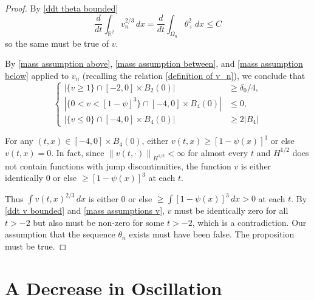 \documentclass[11pt]{amsart}
\theoremstyle{remark}
\theoremstyle{definition}
\newcommand{\R}{\mathbb{R}}
\newcommand{\norm}[1]{\left\lVert#1\right\rVert}
\newcommand{\abs}[1]{\left\lvert #1 \right\rvert}
\newcommand{\ddt}{\frac{d}{dt}}
\begin{document}
\begin{proof}
By \eqref{ddt theta bounded}
\begin{equation} \label{ddt v bounded} \ddt \int_{\R^2} v_n^{2/3} \,dx = \ddt \int_{\Omega_n} \theta_+^2 \,dx \leq C \end{equation}
so the same must be true of $v$.

By \eqref{mass assumption above}, \eqref{mass assumption between}, and \eqref{mass assumption below} applied to $v_n$ (recalling the relation \eqref{definition of v_n}), we conclude that
\begin{equation} \label{mass assumptions v} \begin{cases} 
\abs{\{v \geq 1\} \cap [-2,0]\times B_2(0)} &\geq \delta_0/4, \\
\abs{\{0 < v < [1-\psi]^3\} \cap [-4,0]\times B_4(0)} &\leq 0, \\
\abs{\{v \leq 0\} \cap [-4,0]\times B_4(0)} &\geq 2|B_4|
\end{cases} \end{equation}


For any $(t,x) \in [-4,0]\times B_4(0)$, either $v(t,x) \geq [1 - \psi(x)]^3$ or else $v(t,x) = 0$.  In fact, since $\norm{v(t,\cdot)}_{H^{1/2}} < \infty$ for almost every $t$ and $H^{1/2}$ does not contain functions with jump discontinuities, the function $v$ is either identically 0 or else $\geq [1-\psi(x)]^3$ at each $t$.  

Thus $\int v(t,x)^{2/3} \,dx$ is either 0 or else $\geq \int [1-\psi(x)]^3 \,dx > 0$ at each $t$.  By \eqref{ddt v bounded} and \eqref{mass assumptions v}, $v$ must be identically zero for all $t > -2$ but also must be non-zero for some $t > -2$, which is a contradiction.  Our assumption that the sequence $\theta_n$ exists must have been false.  The proposition must be true.  

\end{proof}



\section{A Decrease in Oscillation} \label{sec:harnack}
\end{document}
